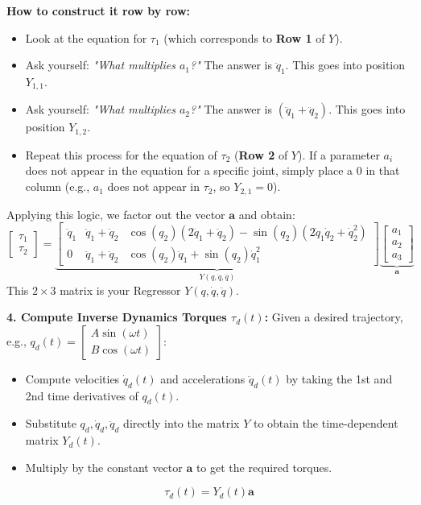 \documentclass[11pt,a4paper]{article}
\begin{document}
\textbf{How to construct it row by row:}
\begin{itemize}
    \item Look at the equation for $\tau_1$ (which corresponds to \textbf{Row 1} of $Y$).
    \item Ask yourself: \textit{"What multiplies $a_1$?"} The answer is $\ddot{q}_1$. This goes into position $Y_{1,1}$.
    \item Ask yourself: \textit{"What multiplies $a_2$?"} The answer is $(\ddot{q}_1 + \ddot{q}_2)$. This goes into position $Y_{1,2}$.
    \item Repeat this process for the equation of $\tau_2$ (\textbf{Row 2} of $Y$). If a parameter $a_i$ does not appear in the equation for a specific joint, simply place a $0$ in that column (e.g., $a_1$ does not appear in $\tau_2$, so $Y_{2,1} = 0$).
\end{itemize}

Applying this logic, we factor out the vector $\mathbf{a}$ and obtain:
\begin{equation*}
    \begin{bmatrix} \tau_1 \\ \tau_2 \end{bmatrix} =
    \underbrace{\begin{bmatrix}
        \ddot{q}_1 & \ddot{q}_1 + \ddot{q}_2 & \cos(q_2)(2\ddot{q}_1 + \ddot{q}_2) - \sin(q_2)(2\dot{q}_1\dot{q}_2 + \dot{q}_2^2) \\
        0 & \ddot{q}_1 + \ddot{q}_2 & \cos(q_2)\ddot{q}_1 + \sin(q_2)\dot{q}_1^2
    \end{bmatrix}}_{Y(q, \dot{q}, \ddot{q})}
    \underbrace{\begin{bmatrix} a_1 \\ a_2 \\ a_3 \end{bmatrix}}_{\mathbf{a}}
\end{equation*}
This $2 \times 3$ matrix is your Regressor $Y(q, \dot{q}, \ddot{q})$.

\textbf{4. Compute Inverse Dynamics Torques $\tau_d(t)$:}
Given a desired trajectory, e.g., $q_d(t) = \begin{bmatrix} A \sin(\omega t) \\ B \cos(\omega t) \end{bmatrix}$:
\begin{itemize}
    \item Compute velocities $\dot{q}_d(t)$ and accelerations $\ddot{q}_d(t)$ by taking the 1st and 2nd time derivatives of $q_d(t)$.
    \item Substitute $q_d, \dot{q}_d, \ddot{q}_d$ directly into the matrix $Y$ to obtain the time-dependent matrix $Y_d(t)$.
    \item Multiply by the constant vector $\mathbf{a}$ to get the required torques.
\end{itemize}
\begin{equation*}
    \tau_d(t) = Y_d(t) \mathbf{a}
\end{equation*}
\end{document}
